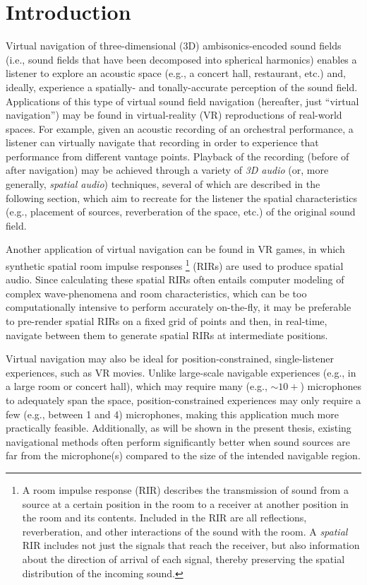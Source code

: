 \chapter{Introduction}
Virtual navigation of three-dimensional (3D) ambisonics-encoded sound fields (i.e., sound fields that have been decomposed into spherical harmonics) enables a listener to explore an acoustic space (e.g., a concert hall, restaurant, etc.) and, ideally, experience a spatially- and tonally-accurate perception of the sound field.
Applications of this type of virtual sound field navigation (hereafter, just ``virtual navigation'') may be found in virtual-reality (VR) reproductions of real-world spaces.
For example, given an acoustic recording of an orchestral performance, a listener can virtually navigate that recording in order to experience that performance from different vantage points.
Playback of the recording (before of after navigation) may be achieved through a variety of \textit{3D audio} (or, more generally, \textit{spatial audio}) techniques, several of which are described in the following section, which aim to recreate for the listener the spatial characteristics (e.g., placement of sources, reverberation of the space, etc.) of the original sound field.

Another application of virtual navigation can be found in VR games, in which synthetic spatial room impulse responses%
\footnote{A room impulse response (RIR) describes the transmission of sound from a source at a certain position in the room to a receiver at another position in the room and its contents.
Included in the RIR are all reflections, reverberation, and other interactions of the sound with the room.
A \textit{spatial} RIR includes not just the signals that reach the receiver, but also information about the direction of arrival of each signal, thereby preserving the spatial distribution of the incoming sound.}
(RIRs) are used to produce spatial audio.
Since calculating these spatial RIRs often entails computer modeling of complex wave-phenomena and room characteristics, which can be too computationally intensive to perform accurately on-the-fly, it may be preferable to pre-render spatial RIRs on a fixed grid of points and then, in real-time, navigate between them to generate spatial RIRs at intermediate positions.

Virtual navigation may also be ideal for position-constrained, single-listener experiences, such as VR movies.
Unlike large-scale navigable experiences (e.g., in a large room or concert hall), which may require many (e.g., $\sim10+$) microphones to adequately span the space, position-constrained experiences may only require a few (e.g., between 1 and 4) microphones, making this application much more practically feasible.
Additionally, as will be shown in the present thesis, existing navigational methods often perform significantly better when sound sources are far from the microphone(s) compared to the size of the intended navigable region.

